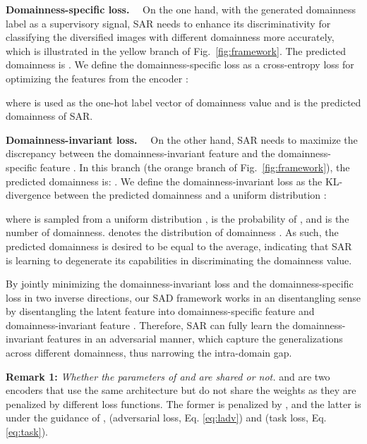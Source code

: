 \documentclass[10pt,journal,compsoc]{IEEEtran}
\renewcommand{\paragraph}[1]{\noindent\textbf{#1}~~}
\begin{document}
\paragraph{Domainness-specific loss.}
 On the one hand, with the generated domainness label  as a supervisory signal, SAR needs to enhance its discriminativity for classifying the diversified images with different domainness more accurately, which is illustrated in the yellow branch of Fig.~\ref{fig:framework}.
The predicted domainness is .
We define the domainness-specific loss  as a cross-entropy loss for optimizing the features from the encoder :

where  is used as the one-hot label vector of domainness value  and  is the predicted domainness of SAR. 

\paragraph{Domainness-invariant loss.}
 On the other hand, SAR needs to maximize the discrepancy between the domainness-invariant feature  and the domainness-specific feature . In this branch (the orange branch of Fig.~\ref{fig:framework}), the predicted domainness is: . We define the domainness-invariant loss  as the KL-divergence between the predicted domainness  and a uniform distribution : 

where  is sampled from a uniform  distribution ,  is the probability of , and  is the number of domainness.
 denotes the distribution of domainness . As such, the predicted domainness  is desired to be equal to the average, indicating that SAR is learning to degenerate its capabilities in discriminating the domainness value. 

By jointly minimizing the domainness-invariant loss  and the domainness-specific loss  in two inverse directions, our SAD framework works in an disentangling sense by disentangling the latent feature into domainness-specific feature  and domainness-invariant feature . Therefore,
SAR can fully learn the domainness-invariant features in an adversarial manner, which capture the generalizations across different domainness, thus narrowing the intra-domain gap. 


\noindent \textbf{Remark 1:} \textit{Whether the parameters of  and  are shared or not.}  and  are two encoders that use the same architecture but do not share the weights as they are penalized by different loss functions. The former is penalized by , and the latter is under the guidance of ,  (adversarial loss, Eq. \eqref{eq:ladv}) and  (task loss, Eq. \eqref{eq:task}).
\end{document}
